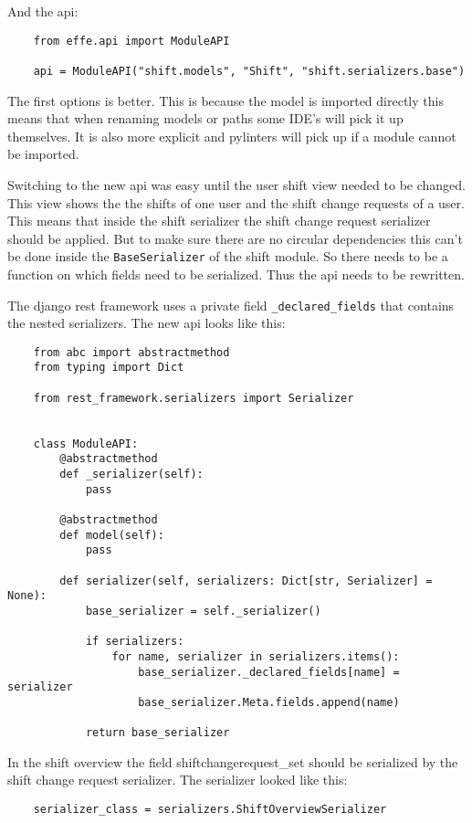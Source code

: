 And the api:
\begin{verbatim}
    from effe.api import ModuleAPI

    api = ModuleAPI("shift.models", "Shift", "shift.serializers.base")
\end{verbatim}

The first options is better. This is because the model is imported directly this means that when renaming models or paths some IDE's will pick it up themselves. It is also more explicit and pylinters will pick up if a module cannot be imported.

Switching to the new api was easy until the user shift view needed to be changed. This view shows the the shifts of one user and the shift change requests of a user. This means that inside the shift serializer the shift change request serializer should be applied. But to make sure there are no circular dependencies this can't be done inside the \texttt{BaseSerializer} of the shift module. So there needs to be a function on which fields need to be serialized. Thus the api needs to be rewritten.

The django rest framework uses a private field \texttt{\_declared\_fields} that contains the nested serializers. The new api looks like this:
\begin{verbatim}
    from abc import abstractmethod
    from typing import Dict

    from rest_framework.serializers import Serializer


    class ModuleAPI:
        @abstractmethod
        def _serializer(self):
            pass

        @abstractmethod
        def model(self):
            pass

        def serializer(self, serializers: Dict[str, Serializer] = None):
            base_serializer = self._serializer()

            if serializers:
                for name, serializer in serializers.items():
                    base_serializer._declared_fields[name] = serializer
                    base_serializer.Meta.fields.append(name)

            return base_serializer
\end{verbatim}

In the shift overview the field shiftchangerequest\_set should be serialized by the shift change request serializer. The serializer looked like this:
\begin{verbatim}
    serializer_class = serializers.ShiftOverviewSerializer
\end{verbatim}

